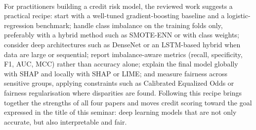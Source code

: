 \documentclass[12pt,a4paper,final]{extreport}
\begin{document}
\paragraph{} For practitioners building a credit risk model, the reviewed work suggests a practical recipe: start with a well-tuned gradient-boosting baseline and a logistic-regression benchmark; handle class imbalance on the training folds only, preferably with a hybrid method such as SMOTE-ENN or with class weights; consider deep architectures such as DenseNet or an LSTM-based hybrid when data are large or sequential; report imbalance-aware metrics (recall, specificity, F1, AUC, MCC) rather than accuracy alone; explain the final model globally with SHAP and locally with SHAP or LIME; and measure fairness across sensitive groups, applying constraints such as Calibrated Equalized Odds or fairness regularisation where disparities are found. Following this recipe brings together the strengths of all four papers and moves credit scoring toward the goal expressed in the title of this seminar: deep learning models that are not only accurate, but also interpretable and fair.
\end{document}
